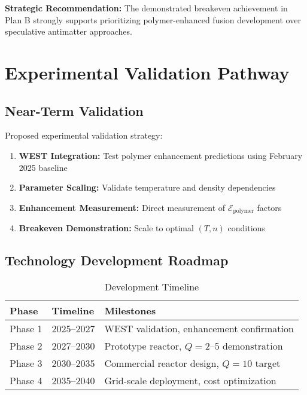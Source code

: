 \documentclass[12pt,a4paper]{article}
\begin{document}
\textbf{Strategic Recommendation:} The demonstrated breakeven achievement in Plan B strongly supports prioritizing polymer-enhanced fusion development over speculative antimatter approaches.

\section{Experimental Validation Pathway}

\subsection{Near-Term Validation}

Proposed experimental validation strategy:

\begin{enumerate}
    \item \textbf{WEST Integration:} Test polymer enhancement predictions using February 2025 baseline
    \item \textbf{Parameter Scaling:} Validate temperature and density dependencies  
    \item \textbf{Enhancement Measurement:} Direct measurement of $\mathcal{E}_{\text{polymer}}$ factors
    \item \textbf{Breakeven Demonstration:} Scale to optimal $(T, n)$ conditions
\end{enumerate}

\subsection{Technology Development Roadmap}

\begin{table}[H]
\centering
\caption{Development Timeline}
\begin{tabular}{@{}lll@{}}
\toprule
\textbf{Phase} & \textbf{Timeline} & \textbf{Milestones} \\
\midrule
Phase 1 & 2025--2027 & WEST validation, enhancement confirmation \\
Phase 2 & 2027--2030 & Prototype reactor, $Q = 2$--5 demonstration \\
Phase 3 & 2030--2035 & Commercial reactor design, $Q = 10$ target \\
Phase 4 & 2035--2040 & Grid-scale deployment, cost optimization \\
\bottomrule
\end{tabular}
\end{table}
\end{document}
